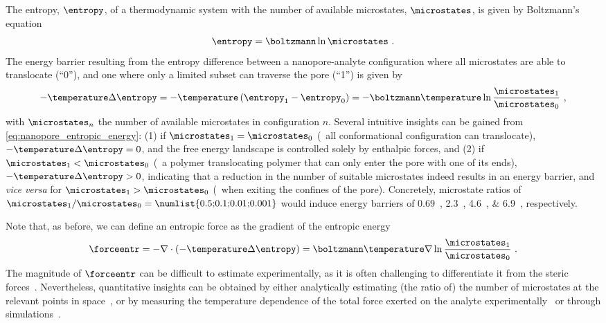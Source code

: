 The entropy, $\entropy$, of a thermodynamic system with the number of available microstates, $\microstates$, is
given by Boltzmann's equation~\cite{Neumann-1980}
%
\begin{equation}\label{eq:nanopores_entropy}
  \entropy = \boltzmann \ln \microstates \text{ .}
\end{equation}
%
The energy barrier resulting from the entropy difference between a nanopore-analyte configuration where all
microstates are able to translocate (``0''), and one where only a limited subset can traverse the pore (``1'')
is given by
%
\begin{equation}\label{eq:nanopore_entropic_energy}
  - \temperature \Delta \entropy = - \temperature \left( \entropy_1 - \entropy_0\right)
  = - \boltzmann \temperature \ln \dfrac{\microstates_1}{\microstates_0}
  \text{ ,}
\end{equation}
%
with $\microstates_n$ the number of available microstates in configuration $n$. Several intuitive insights can
be gained from \cref{eq:nanopore_entropic_energy}: (1) if $\microstates_1 = \microstates_0$ (\eg~all
conformational configuration can translocate), $- \temperature \Delta \entropy = 0$, and the free energy
landscape is controlled solely by enthalpic forces, and (2) if $\microstates_1 < \microstates_0$ (\eg~a
polymer translocating polymer that can only enter the pore with one of its ends), $- \temperature \Delta
\entropy > 0$, indicating that a reduction in the number of suitable microstates indeed results in an energy
barrier, and \textit{vice versa} for $\microstates_1 > \microstates_0$ (\eg~when exiting the confines of the
pore). Concretely, microstate ratios of $\microstates_1 / \microstates_0 =
\text{\numlist{0.5;0.1;0.01;0.001}}$ would induce energy barriers of \SIlist{0.69;2.3;4.6;6.9}{\kbt},
respectively.

Note that, as before, we can define an entropic force as the gradient of the entropic
energy~\cite{Neumann-1980}
%
\begin{equation}\label{eq:nanopore_entropic_force}
  \forceentr = - \nabla \cdot (- \temperature \Delta \entropy )  
             = \boltzmann \temperature \nabla \ln \dfrac{\microstates_1}{\microstates_0}
  \text{ .}
\end{equation}
%
The magnitude of $\forceentr$ can be difficult to estimate experimentally, as it is often challenging to
differentiate it from the steric forces~\cite{Buchsbaum-2013}. Nevertheless, quantitative insights can be
obtained by either analytically estimating (the ratio of) the number of microstates at the relevant points in
space~\cite{Tian-2003,Muthukumar-2010,Cressiot-2015}, or by measuring the temperature dependence of the total
force exerted on the analyte experimentally~\cite{Meller-2002,Payet-2015} or through
simulations~\cite{Tian-2003,Matysiak-2006,Vaitheeswaran-2014,Luo-2017}.



